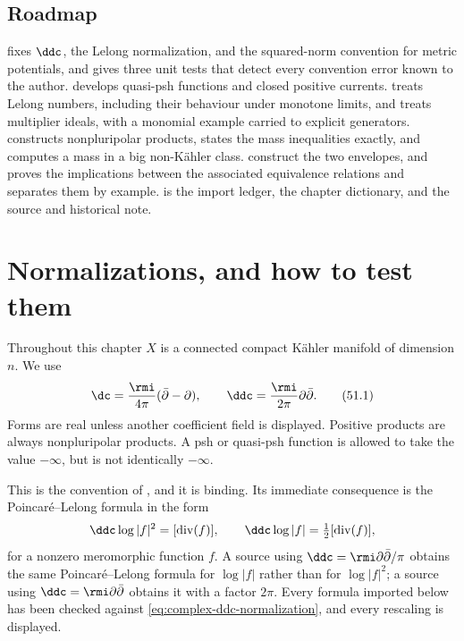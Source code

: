 \subsection{Roadmap}
\label{sec:ch51-roadmap}

 fixes \(\ddc\), the Lelong normalization,
and the squared-norm convention for metric potentials, and gives three
unit tests that detect every convention error known to the author.
 develops quasi-psh functions and closed positive
currents.   treats Lelong numbers, including their
behaviour under monotone limits, and
 treats multiplier ideals, with a monomial
example carried to explicit generators.   constructs
nonpluripolar products, states the mass inequalities exactly, and computes
a mass in a big non-K\"ahler class.   construct the two envelopes, and
 proves the implications between the associated
equivalence relations and separates them by example.
 is the import ledger,
 the chapter dictionary, and
 the source and historical note.

\section{Normalizations, and how to test them}
\label{sec:ch51-normalizations}

Throughout this chapter \(X\) is a connected compact K\"ahler manifold of
dimension \(n\).  We use
\[
             \dc=\frac{\rmi}{4\pi}(\bar\partial-\partial),
             \qquad
             \ddc=\frac{\rmi}{2\pi}\partial\bar\partial .
\tag{51.1}\label{eq:complex-ddc-normalization}
\]
Forms are real unless another coefficient field is displayed.
Positive products are always nonpluripolar products.  A psh or
quasi-psh function is allowed to take the value \(-\infty\), but is not
identically \(-\infty\).

This is the convention of , and it is binding.
Its immediate consequence is the Poincar\'e--Lelong formula in the form
\[
 \ddc\log|f|^2=[\operatorname{div}(f)],
 \qquad
 \ddc\log|f|=\tfrac12[\operatorname{div}(f)],
\]
for a nonzero meromorphic function \(f\).  A source using
\(\ddc=\rmi\partial\bar\partial/\pi\) obtains the same Poincar\'e--Lelong
formula for \(\log|f|\) rather than for \(\log|f|^2\); a source using
\(\ddc=\rmi\partial\bar\partial\) obtains it with a factor \(2\pi\).
Every formula imported below has been checked against
\eqref{eq:complex-ddc-normalization}, and every rescaling is displayed.

